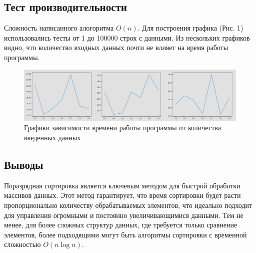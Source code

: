 \documentclass[12pt]{article}
\begin{document}
\newpage
\subsection*{Тест производительности}

Сложность написанного алогоритма $O(n)$. Для построения графика (Рис. 1) использовались тесты от 1 до 100000 строк с данными.
Из нескольких графиков видно, что количество входных данных почти не влияет на время работы программы.

\begin{figure}
    \centering
    \includegraphics[width=\textwidth]{graph.png}
    \caption{Графики зависимости времени работы программы от количества введенных данных}
\end{figure}

\newpage
\subsection*{Выводы}

Поразрядная сортировка является ключевым методом для быстрой обработки массивов данных.
Этот метод гарантирует, что время сортировки будет расти пропорционально количеству обрабатываемых элементов, что идеально подходит для управления огромными и постоянно увеличивающимися данными.
Тем не менее, для более сложных структур данных, где требуется только сравнение элементов, более подходящими могут быть алгоритмы сортировки с временной сложностью $O(n \log n)$.
\end{document}
